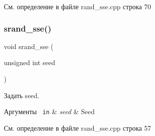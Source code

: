 См. определение в файле rand\+\_\+sse.\+cpp строка 70

\mbox{\label{group__rand__sseh_ga80db1a2aa7de7edf52b9c60e101d556f}} 
\subsubsection{\texorpdfstring{srand\_sse()}{srand\_sse()}}
{\footnotesize\ttfamily void srand\+\_\+sse (\begin{DoxyParamCaption}\item[{unsigned int}]{seed }\end{DoxyParamCaption})}



Задать seed. 


\begin{DoxyCode}{0}
\end{DoxyCode}
 
\begin{DoxyParams}[1]{Аргументы}
\mbox{\texttt{ in}}  & {\em seed} & Seed \\
\hline
\end{DoxyParams}


См. определение в файле rand\+\_\+sse.\+cpp строка 57

